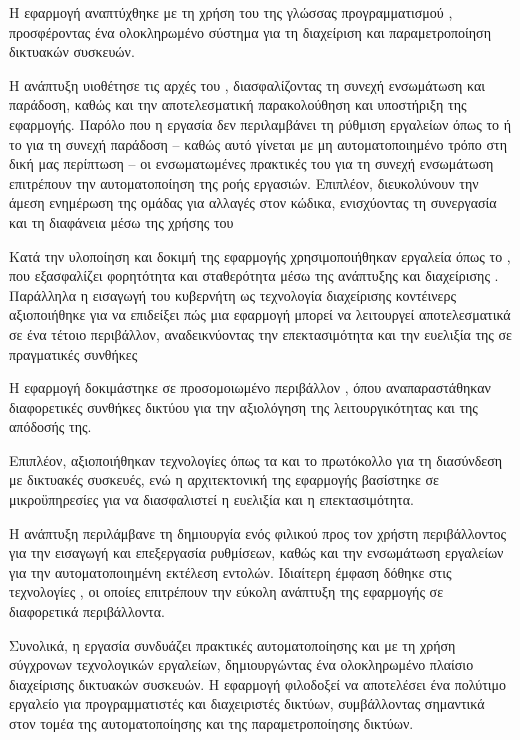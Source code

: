 Η εφαρμογή αναπτύχθηκε με τη χρήση του  της 
γλώσσας προγραμματισμού , προσφέροντας ένα ολοκληρωμένο  
σύστημα για τη διαχείριση και παραμετροποίηση δικτυακών συσκευών. 

Η ανάπτυξη υιοθέτησε τις αρχές του , 
διασφαλίζοντας τη συνεχή ενσωμάτωση και παράδοση, 
καθώς και την αποτελεσματική παρακολούθηση και 
υποστήριξη της εφαρμογής. Παρόλο που η εργασία δεν περιλαμβάνει τη 
ρύθμιση εργαλείων όπως το  ή το  
για τη συνεχή παράδοση – καθώς αυτό γίνεται με μη αυτοματοποιημένο τρόπο στη δική μας περίπτωση – 
οι ενσωματωμένες πρακτικές του  για τη συνεχή 
ενσωμάτωση επιτρέπουν την αυτοματοποίηση της ροής εργασιών. 
Επιπλέον, διευκολύνουν την άμεση ενημέρωση της ομάδας για αλλαγές 
στον κώδικα, ενισχύοντας τη συνεργασία και τη διαφάνεια μέσω της 
χρήσης του 

Κατά την υλοποίηση και δοκιμή της εφαρμογής χρησιμοποιήθηκαν εργαλεία όπως το , 
που εξασφαλίζει φορητότητα και σταθερότητα μέσω της ανάπτυξης και διαχείρισης . 
Παράλληλα η εισαγωγή του κυβερνήτη ως τεχνολογία διαχείρισης κοντέινερς αξιοποιήθηκε 
για να επιδείξει πώς μια εφαρμογή μπορεί να λειτουργεί αποτελεσματικά σε ένα τέτοιο περιβάλλον, 
αναδεικνύοντας την επεκτασιμότητα και την ευελιξία της σε πραγματικές συνθήκες

Η εφαρμογή δοκιμάστηκε σε προσομοιωμένο περιβάλλον , 
όπου αναπαραστάθηκαν διαφορετικές συνθήκες δικτύου για την 
αξιολόγηση της λειτουργικότητας και της απόδοσής της.

Επιπλέον, αξιοποιήθηκαν τεχνολογίες όπως τα  
και το πρωτόκολλο  για τη διασύνδεση με δικτυακές συσκευές, 
ενώ η αρχιτεκτονική της εφαρμογής βασίστηκε σε μικροϋπηρεσίες 
για να διασφαλιστεί η ευελιξία και η επεκτασιμότητα. 

Η ανάπτυξη περιλάμβανε τη δημιουργία ενός φιλικού προς τον χρήστη 
περιβάλλοντος για την εισαγωγή και επεξεργασία ρυθμίσεων, καθώς και 
την ενσωμάτωση εργαλείων για την αυτοματοποιημένη εκτέλεση εντολών. 
Ιδιαίτερη έμφαση δόθηκε στις τεχνολογίες , 
οι οποίες επιτρέπουν την εύκολη ανάπτυξη της εφαρμογής σε διαφορετικά περιβάλλοντα.

Συνολικά, η εργασία συνδυάζει πρακτικές αυτοματοποίησης και  
με τη χρήση σύγχρονων τεχνολογικών εργαλείων, δημιουργώντας ένα 
ολοκληρωμένο πλαίσιο διαχείρισης δικτυακών συσκευών. 
Η εφαρμογή φιλοδοξεί να αποτελέσει ένα πολύτιμο εργαλείο 
για προγραμματιστές και διαχειριστές δικτύων, συμβάλλοντας 
σημαντικά στον τομέα της αυτοματοποίησης και της παραμετροποίησης 
δικτύων.